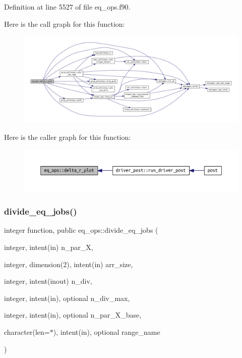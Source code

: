 Definition at line 5527 of file eq\+\_\+ops.\+f90.

Here is the call graph for this function\+:\nopagebreak
\begin{figure}[H]
\begin{center}
\leavevmode
\includegraphics[width=350pt]{namespaceeq__ops_ac0a79893900631d25b170be0abd2c131_cgraph}
\end{center}
\end{figure}
Here is the caller graph for this function\+:\nopagebreak
\begin{figure}[H]
\begin{center}
\leavevmode
\includegraphics[width=350pt]{namespaceeq__ops_ac0a79893900631d25b170be0abd2c131_icgraph}
\end{center}
\end{figure}
\mbox{\label{namespaceeq__ops_a8fae749abe55865d8135fef536a8e8f1}} 
\subsubsection{\texorpdfstring{divide\+\_\+eq\+\_\+jobs()}{divide\_eq\_jobs()}}
{\footnotesize\ttfamily integer function, public eq\+\_\+ops\+::divide\+\_\+eq\+\_\+jobs (\begin{DoxyParamCaption}\item[{integer, intent(in)}]{n\+\_\+par\+\_\+X,  }\item[{integer, dimension(2), intent(in)}]{arr\+\_\+size,  }\item[{integer, intent(inout)}]{n\+\_\+div,  }\item[{integer, intent(in), optional}]{n\+\_\+div\+\_\+max,  }\item[{integer, intent(in), optional}]{n\+\_\+par\+\_\+\+X\+\_\+base,  }\item[{character(len=$\ast$), intent(in), optional}]{range\+\_\+name }\end{DoxyParamCaption})}




